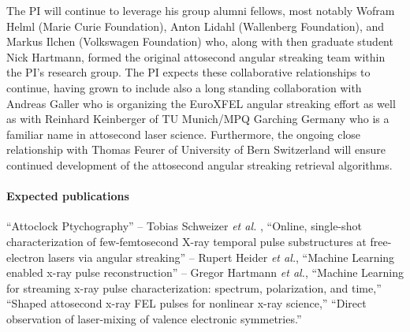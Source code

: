 The PI will continue to leverage his group alumni fellows, most notably Wofram Helml (Marie Curie Foundation), Anton Lidahl (Wallenberg Foundation), and Markus Ilchen (Volkswagen Foundation) who, along with then graduate student Nick Hartmann, formed the original attosecond angular streaking team within the PI's research group.
The PI expects these collaborative relationships to continue, having grown to include also a long standing collaboration with Andreas Galler who is organizing the EuroXFEL angular streaking effort as well as with Reinhard Keinberger of TU Munich/MPQ Garching Germany who is a familiar name in attosecond laser science.
Furthermore, the ongoing close relationship with Thomas Feurer of University of Bern Switzerland will ensure continued development of the attosecond angular streaking retrieval algorithms.

\paragraph{Expected publications}
``Attoclock Ptychography'' -- Tobias Schweizer \textit{et al.} \cite{Feurer2018},
``Online, single-shot characterization of few-femtosecond X-ray temporal pulse substructures at free-electron lasers via angular streaking'' -- Rupert Heider \textit{et al.},
``Machine Learning enabled x-ray pulse reconstruction'' --  Gregor Hartmann \textit{et al.},
``Machine Learning for streaming x-ray pulse characterization: spectrum, polarization, and time,''
``Shaped attosecond x-ray FEL pulses for nonlinear x-ray science,''
``Direct observation of laser-mixing of valence electronic symmetries.''
